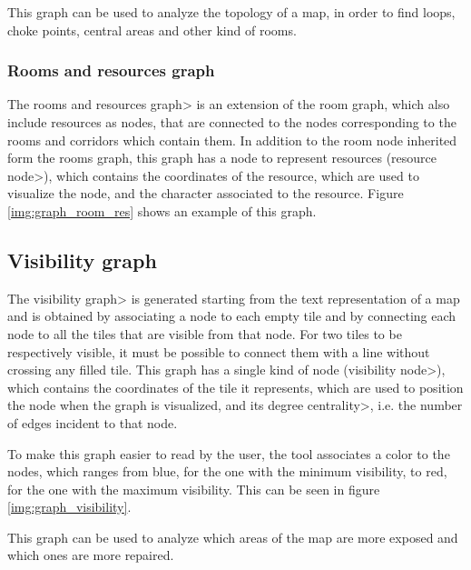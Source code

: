 \par

This graph can be used to analyze the topology of a map, in order to find loops, choke points, central areas and other kind of rooms.

\subsubsection{Rooms and resources graph}

The \<rooms and resources graph> is an extension of the room graph, which also include resources as nodes, that are connected to the nodes corresponding to the rooms and corridors which contain them. In addition to the room node inherited form the rooms graph, this graph has a node to represent resources (\<resource node>), which contains the coordinates of the resource, which are used to visualize the node, and the character associated to the resource. Figure \ref{img:graph_room_res} shows an example of this graph.

\subsection{Visibility graph}

The \<visibility graph> is generated starting from the text representation of a map and is obtained by associating a node to each empty tile and by connecting each node to all the tiles that are visible from that node. For two tiles to be respectively visible, it must be possible to connect them with a line without crossing any filled tile. This graph has a single kind of node (\<visibility node>), which contains the coordinates of the tile it represents, which are used to position the node when the graph is visualized, and its \<degree centrality>, i.e. the number of edges incident to that node. 

\par

To make this graph easier to read by the user, the tool associates a color to the nodes, which ranges from blue, for the one with the minimum visibility, to red, for the one with the maximum visibility. This can be seen in figure \ref{img:graph_visibility}.

\par

This graph can be used to analyze which areas of the map are more exposed and which ones are more repaired.

